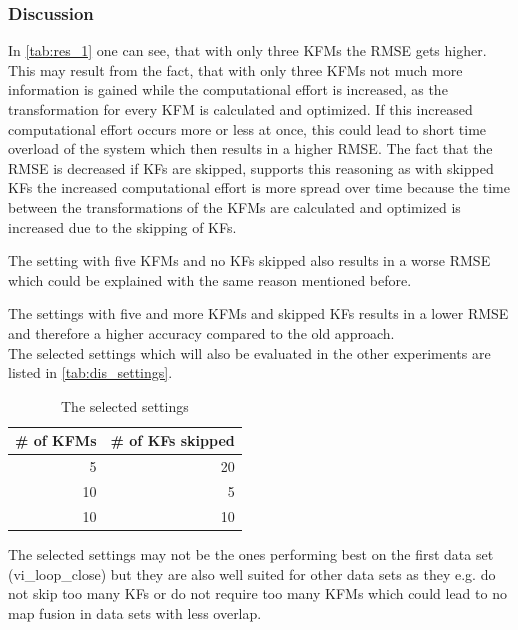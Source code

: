 \subsubsection{Discussion}
In \autoref{tab:res_1} one can see, that with only three \acp{KFM} the \ac{RMSE} gets higher. This may result from the fact, that with only three \acp{KFM} not much more information is gained while the computational effort is increased, as the transformation for every \ac{KFM} is calculated and optimized. If this increased computational effort occurs more or less at once, this could lead to short time overload of the system which then results in a higher \ac{RMSE}. The fact that the \ac{RMSE} is decreased if \acp{KF} are skipped, supports this reasoning as with skipped \acp{KF} the increased computational effort is more spread over time because the time between the transformations of the \acp{KFM} are calculated and optimized is increased due to the skipping of \acp{KF}.

The setting with five \acp{KFM} and no \acp{KF} skipped also results in a worse \ac{RMSE} which could be explained with the same reason mentioned before.

The settings with five and more \acp{KFM} and skipped \acp{KF} results in a lower \ac{RMSE} and therefore a higher accuracy compared to the old approach.\\

The selected settings which will also be evaluated in the other experiments are listed in \autoref{tab:dis_settings}.

\begin{table}[ht!]
	\begin{center}
		\begin{tabular}{r|r}
			\# of \acp{KFM} & \# of \acp{KF} skipped  \\ 
			\hline 
			5 & 20 \\ 
			10 & 5 \\ 
			10 & 10 \\ 
		\end{tabular} 
	\end{center}
	\caption{The selected settings}
	\label{tab:dis_settings}
\end{table}

The selected settings may not be the ones performing best on the first data set (vi\_loop\_close) but they are also well suited for other data sets as they e.g. do not skip too many \acp{KF} or do not require too many \acp{KFM} which could lead to no map fusion in data sets with less overlap.\\

